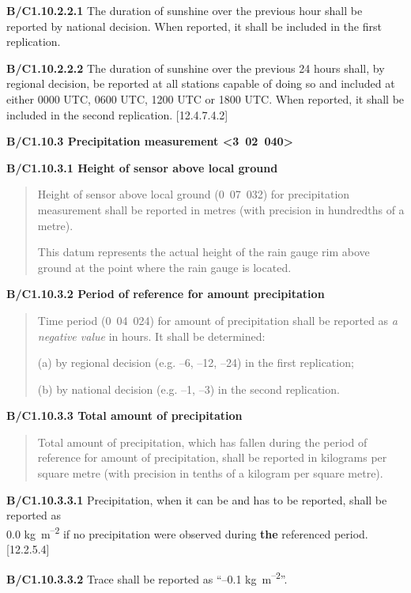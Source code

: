 \textbf{B/C1.10.2.2.1} The duration of sunshine over the previous hour shall be reported by national decision. When reported, it shall be included in the first replication.

\textbf{B/C1.10.2.2.2} The duration of sunshine over the previous 24 hours shall, by regional decision, be reported at all stations capable of doing so and included at either 0000 UTC, 0600 UTC, 1200 UTC or 1800 UTC. When reported, it shall be included in the second replication. {[}12.4.7.4.2{]}

\textbf{B/C1.10.3 Precipitation measurement \textless3~02~040\textgreater{}}

\textbf{B/C1.10.3.1 Height of sensor above local ground}

\begin{quote}
Height of sensor above local ground (0~07~032) for precipitation measurement shall be reported in metres (with precision in hundredths of a metre).

This datum represents the actual height of the rain gauge rim above ground at the point where the rain gauge is located.
\end{quote}

\textbf{B/C1.10.3.2 Period of reference for amount precipitation}

\begin{quote}
Time period (0~04~024) for amount of precipitation shall be reported as \emph{a negative value} in hours. It shall be determined:

(a) by regional decision (e.g. --6, --12, --24) in the first replication;

(b) by national decision (e.g. --1, --3) in the second replication.
\end{quote}

\textbf{B/C1.10.3.3 Total amount of precipitation}

\begin{quote}
Total amount of precipitation, which has fallen during the period of reference for amount of precipitation, shall be reported in kilograms per square metre (with precision in tenths of a kilogram per square metre).
\end{quote}

\textbf{B/C1.10.3.3.1} Precipitation, when it can be and has to be reported, shall be reported as\\
0.0 kg~m\textsuperscript{--2} if no precipitation were observed during \textbf{the} referenced period. {[}12.2.5.4{]}

\textbf{B/C1.10.3.3.2} Trace shall be reported as ``--0.1 kg~m\textsuperscript{--2}''.

